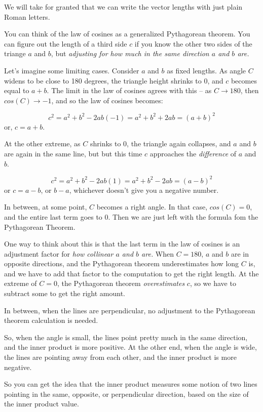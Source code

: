 \documentclass[
]{book}
\begin{document}
We will take for granted that we can write the vector lengths with just plain Roman letters.

You can think of the law of cosines as a generalized Pythagorean theorem. You can figure out the length of a third side \(c\) if you know the other two sides of the triange \(a\) and \(b\), but \emph{adjusting for how much in the same direction \(a\) and \(b\) are.}

Let's imagine some limiting cases. Consider \(a\) and \(b\) as fixed lengths. As angle \(C\) widens to be close to 180 degrees, the triangle height shrinks to 0, and \(c\) becomes equal to \(a + b\). The limit in the law of cosines agrees with this -- as \(C \rightarrow 180\), then \(cos(C) \rightarrow -1\), and so the law of cosines becomes:

\[c^2 = a^2 + b^2 - 2 a b (-1) = a^2 + b^2 + 2 a b = (a + b)^2\]
or, \(c = a + b\).

At the other extreme, as \(C\) shrinks to 0, the triangle again collapses, and \(a\) and \(b\) are again in the same line, but but this time \(c\) approaches the \emph{difference} of \(a\) and \(b\).

\[c^2 = a^2 + b^2 - 2 a b (1) = a^2 + b^2 - 2 a b = (a - b)^2\]
or \(c = a - b\), or \(b - a\), whichever doesn't give you a negative number.

In between, at some point, \(C\) becomes a right angle. In that case, \(cos(C) = 0\), and the entire last term goes to 0. Then we are just left with the formula fom the Pythagorean Theorem.

One way to think about this is that the last term in the law of cosines is an adjustment factor for \emph{how collinear \(a\) and \(b\) are.} When \(C = 180\), \(a\) and \(b\) are in opposite directions, and the Pythagorean theorem underestimates how long \(C\) is, and we have to add that factor to the computation to get the right length. At the extreme of \(C = 0\), the Pythagorean theorem \emph{overestimates} \(c\), so we have to subtract some to get the right amount.

In between, when the lines are perpendicular, no adjustment to the Pythagorean theorem calculation is needed.

So, when the angle is small, the lines point pretty much in the same direction, and the inner product is more positive. At the other end, when the angle is wide, the lines are pointing away from each other, and the inner product is more negative.

So you can get the idea that the inner product measures some notion of two lines pointing in the same, opposite, or perpendicular direction, based on the size of the inner product value.
\end{document}
